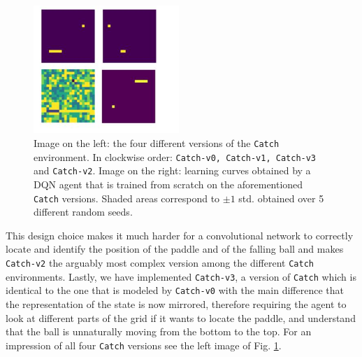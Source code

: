 \begin{figure}[ht]
\begin{minipage}{0.5\textwidth}
	\centering
\includegraphics[width=5.5cm]{./Images/Chapter08/catch_games}
\end{minipage}%
\begin{minipage}{0.5\textwidth}
	\centering
	
\end{minipage}
\caption{Image on the left: the four different versions of the \texttt{Catch} environment. In clockwise order: \texttt{Catch-v0, Catch-v1, Catch-v3} and \texttt{Catch-v2}. Image on the right: learning curves obtained by a DQN agent that is trained from scratch on the aforementioned \texttt{Catch} versions. Shaded areas correspond to $\pm1$ std. obtained over 5 different random seeds.}
\label{fig:catch_baselines}
\end{figure}
This design choice makes it much harder for a convolutional network to correctly locate and identify the position of the paddle and of the falling ball and makes \texttt{Catch-v2} the arguably most complex version among the different \texttt{Catch} environments. Lastly, we have implemented \texttt{Catch-v3}, a version of \texttt{Catch} which is identical to the one that is modeled by \texttt{Catch-v0} with the main difference that the representation of the state is now mirrored, therefore requiring the agent to look at different parts of the grid if it wants to locate the paddle, and understand that the ball is unnaturally moving from the bottom to the top. For an impression of all four \texttt{Catch} versions see the left image of Fig. \ref{fig:catch_baselines}.
